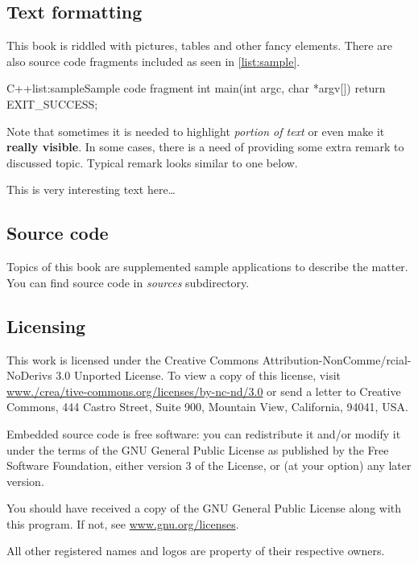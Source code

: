 \subsection*{Text formatting}
This book is riddled with pictures, tables and other fancy elements. There are also source code fragments included as seen in \autoref{list:sample}.

\begin{fdoccode}{C++}{list:sample}{Sample code fragment}
int main(int argc, char *argv[]) {
	return EXIT_SUCCESS;
}
\end{fdoccode}

Note that sometimes it is needed to highlight \emph{portion of text} or even make it \textbf{really visible}. In some cases, there is a need of providing some extra remark to discussed topic. Typical remark looks similar to one below.

\begin{fdocextra}
This is very interesting text here\ldots
\end{fdocextra}

\subsection*{Source code}
Topics of this book are supplemented sample applications to describe the matter. You can find source code in \textit{sources} subdirectory.

\subsection*{Licensing}
This work is licensed under the Creative Commons Attribution-NonComme\-/rcial-NoDerivs 3.0 Unported License. To view a copy of this license, visit \href{http://www.creativecommons.org/licenses/by-nc-nd/3.0}{www.\-/crea\-/tive-commons.org/licenses/by-nc-nd/3.0} or send a letter to Creative Commons, 444 Castro Street, Suite 900, Mountain View, California, 94041, USA.

Embedded \cpp source code is free software: you can redistribute it and/or modify it under the terms of the GNU General Public License as published by the Free Software Foundation, either version 3 of the License, or (at your option) any later version.

You should have received a copy of the GNU General Public License along with this program. If not, see \href{http://www.gnu.org/licenses}{www.gnu.org/licenses}.

All other registered names and logos are property of their respective owners.
